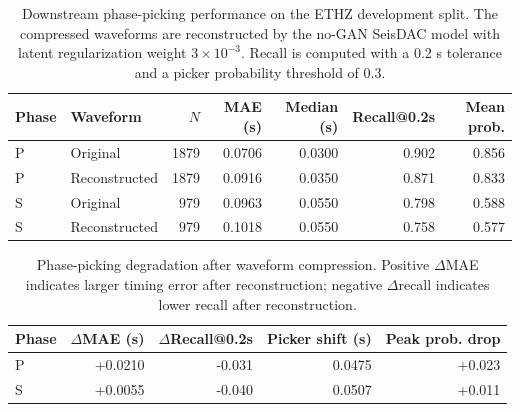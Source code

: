 \begin{table}[t]
\centering
\caption{Downstream phase-picking performance on the ETHZ development split. The compressed waveforms are reconstructed by the no-GAN SeisDAC model with latent regularization weight $3\times10^{-3}$. Recall is computed with a 0.2 s tolerance and a picker probability threshold of 0.3.}
\label{tab:ethz_picking_performance}
\begin{tabular}{llrrrrr}
\toprule
Phase & Waveform & $N$ & MAE (s) & Median (s) & Recall@0.2s & Mean prob. \\
\midrule
P & Original      & 1879 & 0.0706 & 0.0300 & 0.902 & 0.856 \\
P & Reconstructed & 1879 & 0.0916 & 0.0350 & 0.871 & 0.833 \\
S & Original      &  979 & 0.0963 & 0.0550 & 0.798 & 0.588 \\
S & Reconstructed &  979 & 0.1018 & 0.0550 & 0.758 & 0.577 \\
\bottomrule
\end{tabular}
\end{table}

\begin{table}[t]
\centering
\caption{Phase-picking degradation after waveform compression. Positive $\Delta$MAE indicates larger timing error after reconstruction; negative $\Delta$recall indicates lower recall after reconstruction.}
\label{tab:ethz_picking_degradation}
\begin{tabular}{lrrrr}
\toprule
Phase & $\Delta$MAE (s) & $\Delta$Recall@0.2s & Picker shift (s) & Peak prob. drop \\
\midrule
P & +0.0210 & -0.031 & 0.0475 & +0.023 \\
S & +0.0055 & -0.040 & 0.0507 & +0.011 \\
\bottomrule
\end{tabular}
\end{table}
